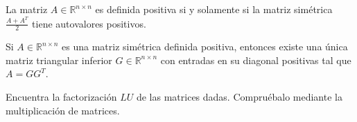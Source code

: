 \begin{theorem}
    La matriz $A\in\mathbb{R}^{n\times n}$ es definida positiva si y solamente si la matriz simétrica
    $\frac{A+A^{T}}{2}$ tiene autovalores positivos.
\end{theorem}

\begin{theorem}
    Si $A\in\mathbb{R}^{n\times n}$ es una matriz simétrica definida positiva,
    entonces existe una única matriz triangular inferior $G\in\mathbb{R}^{n\times n}$
    con entradas en su diagonal positivas tal que $A=GG^{T}$.
\end{theorem}

\begin{questions}
    \question

    Encuentra la factorización $LU$ de las matrices dadas.
    Compruébalo mediante la multiplicación de matrices.

    \begin{multicols}{3}
\end{multicols}
\end{questions}
